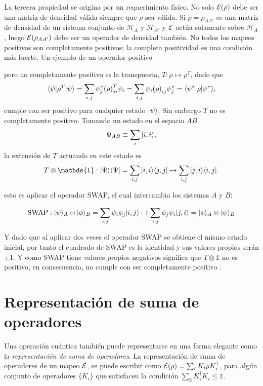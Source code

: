 La tercera propiedad se origina por un requerimiento físico. No solo $\mathcal{E}(\rho)$ debe ser una matriz de densidad válida siempre que $\rho$ sea válida. Si $\rho=\rho_{AA'}$ es una matriz de densidad de un sistema conjunto de $\mathcal{H}_A$ y $\mathcal{H}_{A'}$  y $\mathcal{E}$ actúa solamente sobre $\mathcal{H}_A$, luego $\mathcal{E}(\rho_{AA'})$  debe ser un operador de densidad también. No todos los mapeos positivos son completamente positivos; la completa positividad es una condición más fuerte. Un ejemplo de un operador positivo


pero no completamente positivo es la transpuesta, $T:\rho \mapsto {\rho}^T$, dado que \[\langle \psi |{\rho}^T| \psi \rangle=\sum_{i,j} \psi _j^* {(\rho)}^T _{ji} \psi _i=\sum _{i,j} \psi _i{(\rho)} _{ij} \psi_j^{*}=\langle {\psi}^*|\rho|\psi ^*\rangle,\] cumple con ser positivo para cualquier estado $| \psi \rangle$. Sin embargo $ {T} $ no es completamente positivo. Tomando un estado en el espacio $AB$ \[\Phi_{AB} \equiv \sum_i |i,i\rangle, \] la extensión de $T$ actuando en este estado es \[T \otimes \mathds{1}:|\Psi\rala \Psi|=\sum_{i,j}|i,i\rala j,j| \mapsto \sum_{i,j}|j,i\rala i,j|. \]

esto es aplicar el operador SWAP, el cual intercambia los sistemas $A$ y $B$:

\begin{equation}
    \text{SWAP}:|\psi\rangle_A\otimes|\phi\rangle_B=\sum_{i,j}\psi_i\phi_j |i,j\rangle\mapsto\sum_{i,j}\phi_j\psi_i|j,i\rangle=|\phi\rangle_A\otimes|\psi\rangle_B
\end{equation}

Y dado que al aplicar dos veces el operador SWAP se obtiene el mismo estado inicial, por tanto el cuadrado de SWAP es la identidad y sus valores propios serán $\pm 1$. Y como SWAP tiene valores propios negativos significa que $T \otimes \mathds{1}$ no es positivo, en consecuencia, no cumple con ser completamente positivo  {\cite{preskill2020quantum}}.





\section{Representación de suma de operadores}

Una operación cuántica también puede representarse en una forma elegante como la \textit{representación de suma de operadores}. La representación de suma de operadores de un mapeo $\mathcal{E}$, se puede escribir como $\mathcal{E}(\rho)=\sum_i K_i \rho K_i^\dagger$, para algún conjunto de operadores $\{K_i\}$ que satisfacen la condición $\sum_k K_i^\dagger K_i\le \mathds{1}$.

